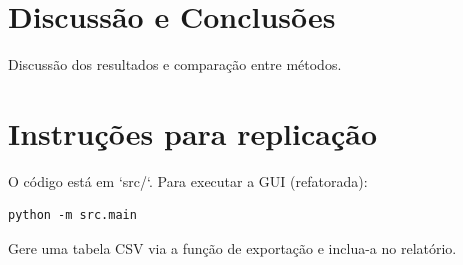 \documentclass[11pt,a4paper]{article}
\begin{document}
\section{Discussão e Conclusões}
Discussão dos resultados e comparação entre métodos.

\section{Instruções para replicação}
O código está em `src/`. Para executar a GUI (refatorada):
\begin{verbatim}
python -m src.main
\end{verbatim}
Gere uma tabela CSV via a função de exportação e inclua-a no relatório.
\end{document}
